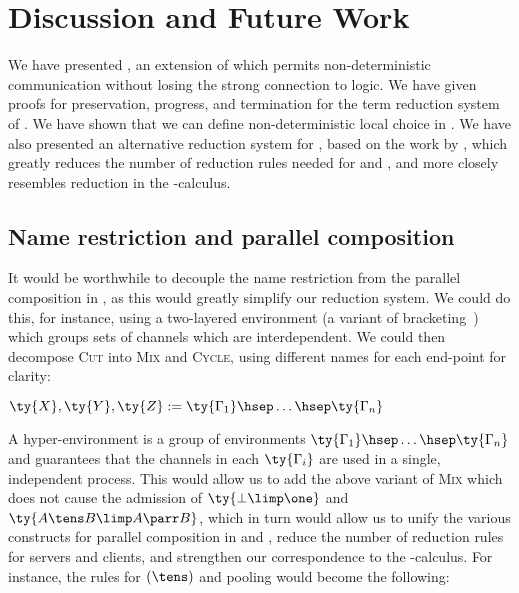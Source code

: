 \documentclass[UKenglish]{llncs}
\begin{document}
\section{Discussion and Future Work}\label{sec:discussion}
We have presented \nodcap, an extension of \cp which permits non-deterministic
communication without losing the strong connection to logic.
We have given proofs for preservation, progress, and termination for the term
reduction system of \nodcap.
We have shown that we can define non-deterministic local choice in \nodcap.
We have also presented an alternative reduction system for \cp, based on the
work by \textcite{lindley2015semantics}, which greatly reduces the number of
reduction rules needed for \cp and \nodcap, and more closely resembles reduction
in the \textpi-calculus.

\subsection{Name restriction and parallel composition}
It would be worthwhile to decouple the name restriction from the parallel
composition in \cp, as this would greatly simplify our reduction system.
We could do this, for instance, using a two-layered environment (a variant of
bracketing~\parencite{moortgat1996}) which groups sets of channels which are
interdependent. We could then decompose \textsc{Cut} into \textsc{Mix} and
\textsc{Cycle}, using different names for each end-point for clarity:
\begin{center}
  \(\ty{X}, \ty{Y}, \ty{Z} := \ty{\Gamma_1} \hsep \dots \hsep \ty{\Gamma_n}\)
  \\[1\baselineskip]
  \hccpInfMix
  \hccpInfCycle
\end{center}
A hyper-environment  is a group of environments \(\ty{\Gamma_1} \hsep \dots
\hsep \ty{\Gamma_n}\) and guarantees that the channels in each \(\ty{\Gamma_i}\)
are used in a single, independent process.
This would allow us to add the above variant of \textsc{Mix} which does not
cause the admission of \(\ty{\bot\limp\one}\) and \(\ty{A \tens B \limp A \parr
  B}\), which in turn would allow us to unify the various constructs for
parallel composition in \cp and \nodcap, reduce the number of reduction rules
for servers and clients, and strengthen our correspondence to the
\textpi-calculus. For instance, the rules for \((\tens)\) and pooling would
become the following:
\begin{center}
  \hccpInfBoundTens
  \begin{prooftree*}
  \end{prooftree*}
\end{center}
\end{document}
